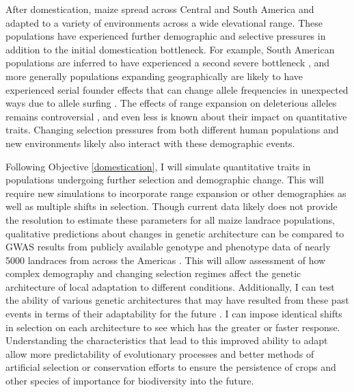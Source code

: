 After domestication, maize spread across Central and South America and adapted to a variety of environments across a wide elevational range. These populations have experienced further demographic and selective pressures in addition to the initial domestication bottleneck. For example, South American populations are inferred to have experienced a second severe bottleneck \citep{Takuno:2015eu}, and more generally populations expanding geographically are likely to have experienced serial founder effects that can change allele frequencies in unexpected ways due to allele surfing \citep{Klopfstein:2005bl}. The effects of range expansion on deleterious alleles remains controversial  \citep{Henn:2015ce, Sudmant:2015}, and even less is known about their impact on quantitative traits. Changing selection pressures from both different human populations and new environments likely also interact with these demographic events. 

Following Objective \ref{domestication}, I will simulate quantitative traits in populations undergoing further selection and demographic change. This will require new simulations to incorporate range expansion or other demographies as well as multiple shifts in selection. Though current data likely does not provide the resolution to estimate these parameters for all maize landrace populations, qualitative predictions about changes in genetic architecture can be compared to GWAS results from publicly available genotype and phenotype data of nearly 5000 landraces from across the Americas \citep{Hearne2015}. This will allow assessment of how complex demography and changing selection regimes affect the genetic architecture of local adaptation to different conditions. Additionally, I can test the ability of various genetic architectures that may have resulted from these past events in terms of their adaptability for the future \citep{Yeaman:2015cc}. I can impose identical shifts in selection on each architecture to see which has the greater or faster response. Understanding the characteristics that lead to this improved ability to adapt allow more predictability of evolutionary processes and better methods of artificial selection or conservation efforts to ensure the persistence of crops and other species of importance for biodiversity into the future. 


